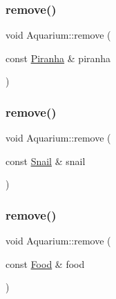 \mbox{\label{class_aquarium_a816328c7f4740a9747735d0bf0d17996}} 
\subsubsection{\texorpdfstring{remove()}{remove()}\hspace{0.1cm}{\footnotesize\ttfamily [2/5]}}
{\footnotesize\ttfamily void Aquarium\+::remove (\begin{DoxyParamCaption}\item[{const \mbox{\hyperlink{class_piranha}{Piranha}} \&}]{piranha }\end{DoxyParamCaption})}

\mbox{\label{class_aquarium_aaa4e4751684ac4f0ea0f818b0ac0eb9c}} 
\subsubsection{\texorpdfstring{remove()}{remove()}\hspace{0.1cm}{\footnotesize\ttfamily [3/5]}}
{\footnotesize\ttfamily void Aquarium\+::remove (\begin{DoxyParamCaption}\item[{const \mbox{\hyperlink{class_snail}{Snail}} \&}]{snail }\end{DoxyParamCaption})}

\mbox{\label{class_aquarium_add8721889913594c0da084d780406d68}} 
\subsubsection{\texorpdfstring{remove()}{remove()}\hspace{0.1cm}{\footnotesize\ttfamily [4/5]}}
{\footnotesize\ttfamily void Aquarium\+::remove (\begin{DoxyParamCaption}\item[{const \mbox{\hyperlink{class_food}{Food}} \&}]{food }\end{DoxyParamCaption})}

\mbox{\label{class_aquarium_aa42e6fbc3cb8445f07875e5f8c127892}} 
